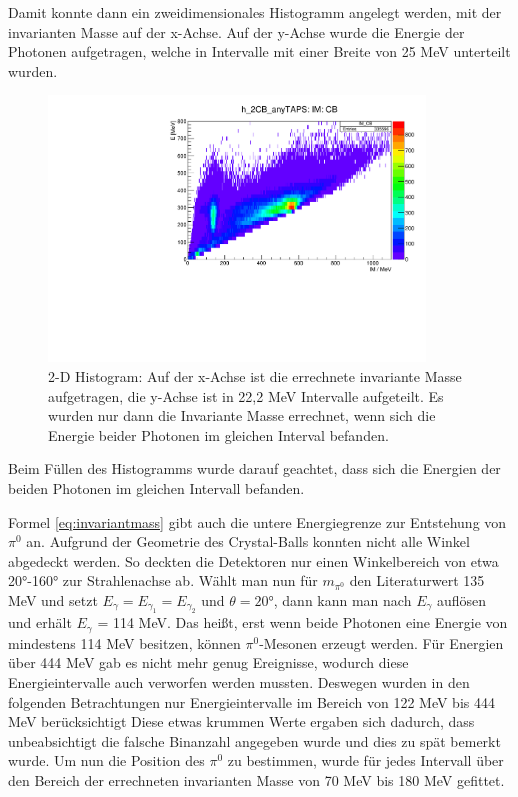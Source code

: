 \documentclass[a4paper,11pt,oneside,final,german,openbib,pdftex]{scrbook}
\begin{document}
{Damit konnte dann ein zweidimensionales Histogramm angelegt werden, mit der invarianten Masse auf der x-Achse. Auf der y-Achse wurde die Energie der Photonen aufgetragen, welche in Intervalle mit einer Breite von 25 MeV unterteilt wurden. 


\begin{figure}[h!]
	\begin{center}
		\includegraphics[width=100mm]{energydependencyallbins0903}
	
		\caption{2-D Histogram: Auf der x-Achse ist die errechnete invariante Masse aufgetragen, die y-Achse ist in 22,2 MeV Intervalle aufgeteilt. Es wurden nur dann die Invariante Masse errechnet, wenn sich die Energie beider Photonen im gleichen Interval befanden.}
			\label{fig:Energy-Interval-Hist-All-Bins}
	\end{center}
\end{figure}

Beim Füllen des Histogramms wurde darauf geachtet, dass sich die Energien der beiden Photonen im gleichen Intervall befanden.

Formel \ref{eq:invariantmass} gibt auch die untere Energiegrenze zur Entstehung von $\pi^0$ an. Aufgrund der Geometrie des Crystal-Balls konnten nicht alle Winkel abgedeckt werden. So deckten die Detektoren nur einen Winkelbereich von etwa 20°-160° zur Strahlenachse ab. Wählt man nun für $m_{\pi^0}$ den Literaturwert 135 MeV und setzt $E_{\gamma}=E_{\gamma_1}=E_{\gamma_2}$ und $\theta= 20$°, dann kann man nach $E_{\gamma}$ auflösen und erhält $E_{\gamma}$ = 114 MeV. Das heißt, erst wenn beide Photonen eine Energie von mindestens 114 MeV besitzen, können $\pi^0$-Mesonen erzeugt werden. Für Energien über 444 MeV gab es nicht mehr genug Ereignisse, wodurch diese Energieintervalle auch verworfen werden mussten. Deswegen wurden in den folgenden Betrachtungen nur Energieintervalle im Bereich von 122 MeV bis 444 MeV berücksichtigt Diese etwas krummen Werte ergaben sich dadurch, dass unbeabsichtigt die falsche Binanzahl angegeben wurde und dies zu spät bemerkt wurde. 
Um nun die Position des $\pi^0$ zu bestimmen, wurde für jedes Intervall über den Bereich der errechneten invarianten Masse von 70 MeV bis 180 MeV gefittet. 


}
\end{document}
